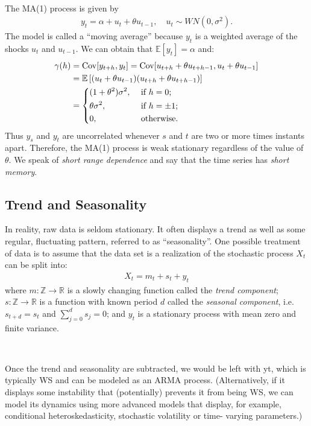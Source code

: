 \begin{eg}[MA(1) Process]\label{eg:MA1}
    \
    
    The MA(1) process is given by
    \begin{gather}\label{eq:MA1}
        y_t = \alpha + u_t + \theta u_{t-1}, \quad u_t \sim WN(0, \sigma^2).
    \end{gather}
    The model is called a ``moving average'' because $y_t$ is a weighted average of the shocks $u_t$ and $u_{t-1}$.
    We can obtain that $\mathbb{E}[y_t] = \alpha$ and:
    \begin{align*}
        \gamma(h) &= \operatorname{Cov}[y_{t+h}, y_t] = \operatorname{Cov}[u_{t+h} + \theta u_{t+h-1}, u_t + \theta u_{t-1}]\\
        &= \mathbb{E}\left[(u_t + \theta u_{t-1})(u_{t+h} + \theta u_{t+h-1})\right]\\
        &= \begin{dcases}
            (1+\theta^2) \sigma^2, &\text{ if } h = 0;\\
            \theta \sigma^2, &\text{ if } h = \pm1;\\
            0, &\text{ otherwise} .
        \end{dcases}
    \end{align*}
    Thus $y_s$ and $y_t$ are uncorrelated whenever $s$ and $t$ are two or more times instants apart.
    Therefore, the MA(1) process is weak stationary regardless of the value of $\theta$.
    We speak of \textit{short range dependence} and say that the time series has \textit{short memory}.
\end{eg}


\subsection{Trend and Seasonality}\label{sec:trendseasonality}
In reality, raw data is seldom stationary. It often displays a trend as well as some regular, fluctuating
pattern, referred to as ``seasonality''.
One possible treatment of data is to assume that the data set is a realization of the stochastic
process $X_t$ can be split into:
\begin{gather*}
    X_t = m_t + s_t + y_t
\end{gather*}
where $m: \mathbb{Z} \to \mathbb{R}$ is a slowly changing function called the \textit{trend component};
$s: \mathbb{Z} \to \mathbb{R}$ is a function with known period $d$ called the \textit{seasonal component}, i.e. $s_{t+d} = s_t$ and $\sum_{j=0}^{d} s_j = 0$;
and $y_t$ is a stationary process with mean zero and finite variance.

\begin{note}
    \

    Once the trend and seasonality are subtracted, we would be left with yt, which is typically WS
and can be modeled as an ARMA process. (Alternatively, if it displays some instability that
(potentially) prevents it from being WS, we can model its dynamics using more advanced
models that display, for example, conditional heteroskedasticity, stochastic volatility or time-
varying parameters.)
\end{note}

